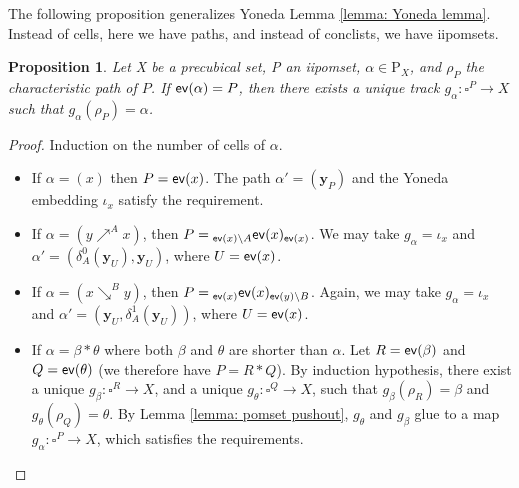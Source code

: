 \documentclass[11pt,a4paper,oldfontcommands]{memoir}
\newcommand*\ev{\textup{\textsf{ev}}}
\newcommand*\subid[3]{{}_{#1}#2_{#3}}
\newtheorem{proposition}[definition]{Proposition}
\begin{document}
The following proposition generalizes Yoneda Lemma \ref{lemma: Yoneda lemma}. Instead of cells, here we have paths, and instead of conclists, we have iipomsets. 
\begin{proposition} \label{prop: prop: generalization of yoneda }
    Let X be a precubical set, P an iipomset, $ \alpha \in \mathrm{P}_{X}$, and $\rho_P$ the characteristic path of $P$.
    If $\ev (\alpha)=P$, then there exists a unique track $g_{\alpha} :\square^P \rightarrow X$ such that $g_{\alpha} (\rho_P)=\alpha$.
\end{proposition}
\begin{proof}

Induction on the number of cells of $\alpha$.
    \begin{itemize}
        \item If $\alpha=(x)$ then $P=\ev (x)$. The path $\alpha'=(\mathbf{y}_P)$ and the Yoneda embedding $\iota_{x}$ satisfy the requirement. 
        \item If $\alpha=(y\nearrow^A x)$, then $P= \subid{\ev(x) \setminus A}{\ev(x)}{\ev(x)} $. We may take $g_{\alpha}=\iota_x$ and \linebreak $\alpha'=(\delta^0_A(\mathbf{y}_U),\mathbf{y}_U)$, where $U=\ev(x)$.  
         \item If $\alpha=(x\searrow^B y)$, then $P= \subid{\ev(x)}{\ev(x)}{\ev(y)\setminus B} $. Again, we may take $g_{\alpha}=\iota_x$ and $\alpha'=(\mathbf{y}_U,\delta^1_A(\mathbf{y}_U))$, where $U=\ev(x)$.  
        \item If $\alpha=\beta*\theta$ where both $\beta$ and $\theta$ are shorter than $\alpha$. Let $R=\ev(\beta)$ and $Q=\ev(\theta)$ (we therefore have $P=R*Q$). By induction hypothesis, there exist a unique $g_{\beta}:\square^R \rightarrow X$, and a unique $g_{\theta}:\square^Q \rightarrow X$, such that $g_{\beta}(\rho_R)=\beta$ and $g_{\theta}(\rho_Q)=\theta$. %
         By Lemma \ref{lemma: pomset pushout}, $g_{\theta}$ and $g_{\beta}$ glue to a map $g_{\alpha}: \square^P \rightarrow X$, which satisfies the requirements.
    \end{itemize}
\end{proof}
\end{document}
